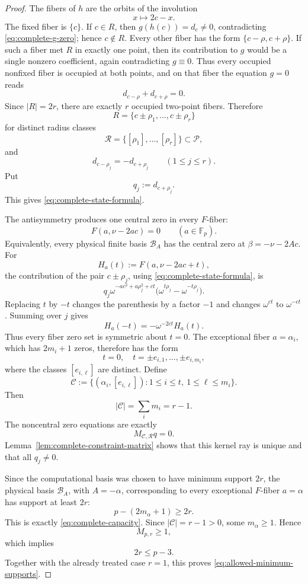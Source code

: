 \documentclass[11pt]{article}
\newcommand{\F}{\mathbb F}
\begin{document}
\begin{proof}
The fibers of \(h\) are the orbits of the involution
\[
 x\longmapsto2c-x.
\]
The fixed fiber is \(\{c\}\).  If \(c\in R\), then
\(g(h(c))=d_c\ne0\), contradicting \eqref{eq:complete-g-zero}; hence
\(c\notin R\).  Every other fiber has the form
\(\{c-\rho,c+\rho\}\).  If such a fiber met \(R\) in exactly one point,
then its contribution to \(g\) would be a single nonzero coefficient,
again contradicting \(g\equiv0\).  Thus every occupied nonfixed fiber is
occupied at both points, and on that fiber the equation \(g=0\) reads
\[
 d_{c-\rho}+d_{c+\rho}=0.
\]
Since \(|R|=2r\), there are exactly \(r\) occupied two-point fibers.
Therefore
\[
 R=
 \{c\pm\rho_1,\ldots,c\pm\rho_r\}
\]
for distinct radius classes
\[
 \mathcal R=
 \{[\rho_1],\ldots,[\rho_r]\}\subset\mathcal P,
\]
and
\begin{equation}
 d_{c-\rho_j}=-d_{c+\rho_j}
 \qquad(1\le j\le r).
 \label{eq:complete-antisymmetry}
\end{equation}
Put
\[
 q_j:=d_{c+\rho_j}.
\]
This gives \eqref{eq:complete-state-formula}.

The antisymmetry produces one central zero in every \(F\)-fiber:
\[
 F(a,\nu-2ac)=0
 \qquad(a\in\F_p).
\]
Equivalently, every physical finite basis \(\mathcal B_A\) has the
central zero at \(\beta=-\nu-2Ac\).
For
\[
 H_a(t):=F(a,\nu-2ac+t),
\]
the contribution of the pair \(c\pm\rho_j\), using
\eqref{eq:complete-state-formula}, is
\[
 q_j\omega^{-ac^2+a\rho_j^2+ct}
 \bigl(\omega^{t\rho_j}-\omega^{-t\rho_j}\bigr).
\]
Replacing \(t\) by \(-t\) changes the parenthesis by a factor \(-1\)
and changes \(\omega^{ct}\) to \(\omega^{-ct}\).  Summing over \(j\)
gives
\begin{equation}
 H_a(-t)
 =
 -\omega^{-2ct}H_a(t).
 \label{eq:complete-fiber-symmetry}
\end{equation}
Thus every fiber zero set is symmetric about \(t=0\).  The
exceptional fiber \(a=\alpha_i\), which has \(2m_i+1\) zeros, therefore
has the form
\[
 t=0,\quad
 t=\pm e_{i,1},\ldots,\pm e_{i,m_i},
\]
where the classes \([e_{i,\ell}]\) are distinct.  Define
\[
 \mathcal C
 :=
 \{(\alpha_i,[e_{i,\ell}]):
 1\le i\le t,\ 1\le\ell\le m_i\}.
\]
Then
\[
 |\mathcal C|
 =
 \sum_i m_i
 =
 r-1.
\]
The noncentral zero equations are exactly
\[
 M_{\mathcal C,\mathcal R}q=0.
\]
Lemma~\ref{lem:complete-constraint-matrix} shows that this kernel ray is
unique and that all \(q_j\ne0\).

Since the computational basis was chosen to have minimum support
\(2r\), the physical basis \(\mathcal B_A\), with \(A=-\alpha\), corresponding
to every exceptional \(F\)-fiber \(a=\alpha\) has support at least \(2r\):
\[
 p-(2m_\alpha+1)\ge2r.
\]
This is exactly \eqref{eq:complete-capacity}.  Since
\(|\mathcal C|=r-1>0\), some \(m_\alpha\ge1\).  Hence
\[
 M_{p,r}\ge1,
\]
which implies
\[
 2r\le p-3.
\]
Together with the already treated case \(r=1\), this proves
\eqref{eq:allowed-minimum-supports}.


\end{proof}
\end{document}
